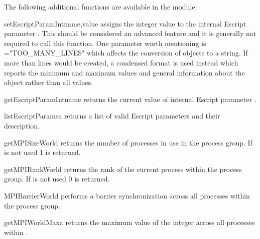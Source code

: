 \noindent The following additional functions are available in the \escript
module:
\begin{funcdesc}{setEscriptParamInt}{name,value}
assigns the integer value  to the internal Escript parameter
. This should be considered an advanced feature and it is generally
not required to call this function. One parameter worth mentioning is
="TOO_MANY_LINES" which affects the conversion of \Data objects to a
string. If more than  lines would be created, a condensed format is
used instead which reports the minimum and maximum values and general
information about the \Data object rather than all values.
\end{funcdesc}

\begin{funcdesc}{getEscriptParamInt}{name}
returns the current value of internal Escript parameter .
\end{funcdesc}

\begin{funcdesc}{listEscriptParams}{a}
returns a list of valid Escript parameters and their description.
\end{funcdesc}

\begin{funcdesc}{getMPISizeWorld}{}
returns the number of \MPI processes in use in the 
process group. If \MPI is not used 1 is returned.
\end{funcdesc}

\begin{funcdesc}{getMPIRankWorld}{}
returns the rank of the current process within the 
process group. If \MPI is not used 0 is returned.
\end{funcdesc}

\begin{funcdesc}{MPIBarrierWorld}{}
performs a barrier synchronization across all processes within the
 process group.
\end{funcdesc}

\begin{funcdesc}{getMPIWorldMax}{a}
returns the maximum value of the integer  across all processes within
.
\end{funcdesc}

